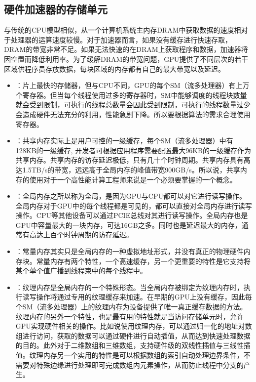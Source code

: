 \documentclass[letterpaper,10pt,english]{sphinxmanual}
\begin{document}
\subsection{硬件加速器的存储单元}
\label{\detokenize{chapter_accelerator/accelerator_architecture:id4}}
\sphinxAtStartPar
与传统的CPU模型相似，从一个计算机系统主内存DRAM中获取数据的速度相对于处理器的运算速度较慢。对于加速器而言，如果没有缓存进行快速存取，DRAM的带宽非常不足。如果无法快速的在DRAM上获取程序和数据，加速器将因空置而降低利用率。为了缓解DRAM的带宽问题，GPU提供了不同层次的若干区域供程序员存放数据，每块区域的内存都有自己的最大带宽以及延迟。
\begin{itemize}
\item {} 
\sphinxAtStartPar
{}：片上最快的存储器，但与CPU不同，GPU的每个SM（流多处理器）有上万个寄存器。但当每个线程使用过多的寄存器时，SM中能够调度的线程块数量就会受到限制，可执行的线程总数量会因此受到限制，可执行的线程数量过少会造成硬件无法充分的利用，性能急剧下降。所以要根据算法的需求合理使用寄存器。

\item {} 
\sphinxAtStartPar
{}：共享内存实际上是用户可控的一级缓存，每个SM（流多处理器）中有128KB的一级缓存,
开发者可根据应用程序需要配置最大96KB的一级缓存作为共享内存。共享内存的访存延迟极低，只有几十个时钟周期。共享内存具有高达1.5TB/s的带宽，远远高于全局内存的峰值带宽900GB/s。所以说，共享内存的使用对于一个高性能计算工程师来说是一个必须要掌握的一个概念。

\item {} 
\sphinxAtStartPar
{}：全局内存之所以称为全局，是因为GPU与CPU都可以对它进行读写操作。全局内存对于GPU中的每个线程都是可见的，都可以直接对全局内存进行读写操作。CPU等其他设备可以通过PCI\sphinxhyphen{}E总线对其进行读写操作。全局内存也是GPU中容量最大的一块内存，可达16GB之多。同时也是延迟最大的内存，通常有高达上百个时钟周期的访存延迟。

\item {} 
\sphinxAtStartPar
{}：常量内存其实只是全局内存的一种虚拟地址形式，并没有真正的物理硬件内存块。常量内存有两个特性，一个高速缓存，另一个更重要的特性是它支持将某个单个值广播到线程束中的每个线程中。

\item {} 
\sphinxAtStartPar
{}：纹理内存是全局内存的一个特殊形态。当全局内存被绑定为纹理内存时，执行读写操作将通过专用的纹理缓存来加速。在早期的GPU上没有缓存，因此每个SM（流多处理器）上的纹理内存为设备提供了唯一真正缓存数据的方法。纹理内存的另外一个特性，也是最有用的特性就是当访问存储单元时，允许GPU实现硬件相关的操作。比如说使用纹理内存，可以通过归一化的地址对数组进行访问，获取的数据可以通过硬件进行自动插值，从而达到快速处理数据的目的。此外对于二维数组和三维数组，支持硬件级的双线性插值与三线性插值。纹理内存另一个实用的特性是可以根据数组的索引自动处理边界条件，不需要对特殊边缘进行处理即可完成数组内元素操作，从而防止线程中分支的产生。

\end{itemize}
\end{document}
